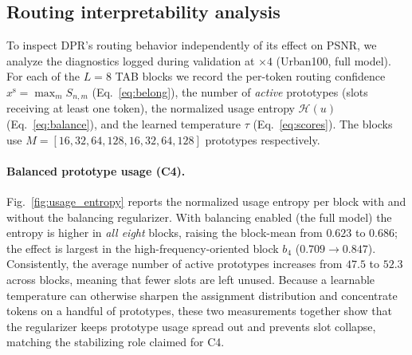 \subsection{Routing interpretability analysis}
\label{sec:routing_analysis}

To inspect DPR's routing behavior independently of its effect on PSNR, we analyze
the diagnostics logged during validation at $\times4$
(Urban100, full model). For each of the $L{=}8$ TAB blocks we record the per-token
routing confidence $x^{\mathrm{s}}=\max_m S_{n,m}$ (Eq.~\eqref{eq:belong}), the
number of \emph{active} prototypes (slots receiving at least one token), the
normalized usage entropy $\mathcal{H}(u)$ (Eq.~\eqref{eq:balance}), and the learned
temperature $\tau$ (Eq.~\eqref{eq:scores}). The blocks use
$M=[16,32,64,128,16,32,64,128]$ prototypes respectively.

\paragraph{Balanced prototype usage (C4).}
Fig.~\ref{fig:usage_entropy} reports the normalized usage entropy per block with
and without the balancing regularizer. With balancing enabled (the full model) the
entropy is higher in \emph{all eight} blocks, raising the block-mean from $0.623$
to $0.686$; the effect is largest in the high-frequency-oriented block $b_4$
($0.709\!\rightarrow\!0.847$). Consistently, the average number of active
prototypes increases from $47.5$ to $52.3$ across blocks, meaning that fewer slots are
left unused. Because a learnable temperature can otherwise sharpen the assignment
distribution and concentrate tokens on a handful of prototypes, these two
measurements together show that the regularizer keeps prototype usage spread out
and prevents slot collapse, matching the stabilizing role claimed for C4.

